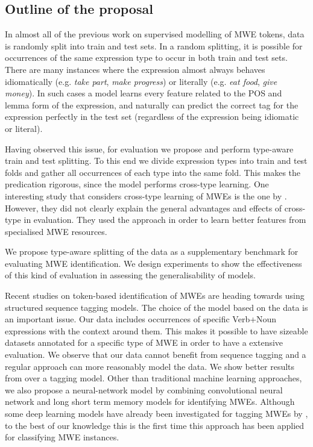 \documentclass[output=paper
,modfonts
,nonflat]{langsci/langscibook}
\begin{document}
\subsection{Outline of the proposal}
\label{s:obs}

In almost all of the previous work on supervised modelling of MWE tokens, data is randomly split into train and test sets. %
In a random splitting, it is possible for occurrences of the same expression type to occur in both train and test sets. There are many instances where the expression almost always behaves idiomatically (e.g. \textit{take part}, \textit{make progress}) or literally (e.g. \textit{eat food}, \textit{give money}). In such cases a model learns every feature related to the POS and lemma form of the expression, and naturally can predict the correct tag for the expression perfectly in the test set (regardless of the expression being idiomatic or literal).  

Having observed this issue, for evaluation we propose and perform type-aware train and test splitting. To this end we divide expression types into train and test folds and gather all occurrences of each type into the same fold. This makes the predication rigorous, since the model performs cross-type learning.
One interesting study that considers cross-type learning of MWEs is the one by \cite{Fothergill2012}. However, they did not clearly explain %
the general advantages and effects of cross-type  in evaluation. They used the approach in order to learn better features from specialised MWE resources. 

We propose type-aware splitting of the data as a supplementary benchmark for evaluating MWE identification. We design experiments to show the effectiveness of this kind of evaluation in assessing the generalisability of models.

Recent studies on token-based identification of MWEs are heading towards using structured sequence tagging models. The choice of the model based on the data is an important issue. Our data includes occurrences of specific Verb+Noun expressions with the context around them. This makes it possible to have sizeable datasets annotated for a specific type of MWE in order to have a extensive evaluation.  
We observe that our data cannot benefit from sequence tagging and a regular  approach can more reasonably model the data. We show better results from  over a tagging model. 
Other than traditional machine learning  approaches, we also propose a neural-network model by combining convolutional neural network and long short term memory models for identifying MWEs. Although some deep learning models have already been investigated for tagging MWEs by \citet{Gharbieh2017}, to the best of our knowledge this is the first time this approach has been applied for classifying MWE instances. 
\end{document}
